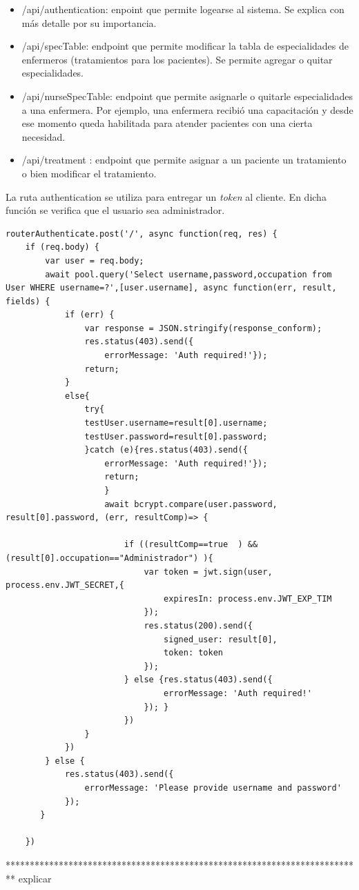 \begin{itemize}
\item /api/authentication: enpoint que permite logearse al sistema. Se explica con más detalle por su importancia.
\item /api/specTable: endpoint que permite modificar la tabla de especialidades de enfermeros (tratamientos para los pacientes). Se permite agregar o quitar especialidades.
\item /api/nurseSpecTable: endpoint que permite asignarle o quitarle especialidades a una enfermera. Por ejemplo, una enfermera recibió una capacitación y desde ese momento queda habilitada para atender pacientes con una cierta necesidad.
\item /api/treatment : endpoint que permite asignar a  un paciente un tratamiento o bien modificar el tratamiento.

\end{itemize}

La ruta authentication se utiliza para entregar un \textit{token} al cliente. En dicha función se verifica que el usuario sea administrador.

\begin{lstlisting}[label=cod:Logueo Web,caption=  Logueo web]
routerAuthenticate.post('/', async function(req, res) {
    if (req.body) {
        var user = req.body;
        await pool.query('Select username,password,occupation from User WHERE username=?',[user.username], async function(err, result, fields) {
            if (err) {
                var response = JSON.stringify(response_conform);
                res.status(403).send({
                    errorMessage: 'Auth required!'});
                return;    
            }
            else{
                try{
                testUser.username=result[0].username;
                testUser.password=result[0].password;
                }catch (e){res.status(403).send({
                    errorMessage: 'Auth required!'});
                    return;    
                    }
                    await bcrypt.compare(user.password, result[0].password, (err, resultComp)=> {

                        if ((resultComp==true  ) &&(result[0].occupation=="Administrador") ){
                            var token = jwt.sign(user, process.env.JWT_SECRET,{
                                expiresIn: process.env.JWT_EXP_TIM
                            });
                            res.status(200).send({
                                signed_user: result[0],
                                token: token
                            });
                        } else {res.status(403).send({
                                errorMessage: 'Auth required!'
                            }); }
                        })                    
                }      
            }) 
        } else {
            res.status(403).send({
                errorMessage: 'Please provide username and password'
            });
       }

    })

\end{lstlisting}
**************************************************************************
explicar

